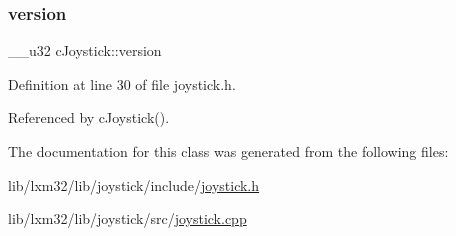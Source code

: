 \subsubsection{\texorpdfstring{version}{version}}
{\footnotesize\ttfamily \+\_\+\+\_\+u32 c\+Joystick\+::version\hspace{0.3cm}{\ttfamily [private]}}



Definition at line 30 of file joystick.\+h.



Referenced by c\+Joystick().



The documentation for this class was generated from the following files\+:\begin{DoxyCompactItemize}
\item 
lib/lxm32/lib/joystick/include/\hyperlink{joystick_8h}{joystick.\+h}\item 
lib/lxm32/lib/joystick/src/\hyperlink{joystick_8cpp}{joystick.\+cpp}\end{DoxyCompactItemize}
